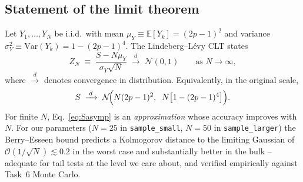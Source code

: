 \documentclass[11pt,a4paper]{article}
\newcommand{\Exp}{\mathbb{E}}
\newcommand{\Var}{\mathrm{Var}}
\begin{document}
\subsection{Statement of the limit theorem}
Let $Y_1,\ldots,Y_N$ be i.i.d.\ with mean
$\mu_Y \equiv \Exp[Y_k] = (2p-1)^2$ and variance
$\sigma_Y^2 \equiv \Var(Y_k) = 1-(2p-1)^4$. The Lindeberg--Lévy CLT
states
\begin{equation}
  Z_N
  \;\equiv\;
  \frac{S - N\mu_Y}{\sigma_Y\sqrt{N}}
  \;\xrightarrow{\;d\;}\;
  \mathcal{N}(0,1)
  \qquad\text{as }N\to\infty,
  \label{eq:clt}
\end{equation}
where $\xrightarrow{d}$ denotes convergence in distribution.
Equivalently, in the original scale,
\begin{equation}
  S \;\xrightarrow{\;d\;}\;
  \mathcal{N}\!\Bigl(N(2p-1)^2,\;\;N\bigl[1-(2p-1)^4\bigr]\Bigr).
  \label{eq:Sasymp}
\end{equation}
For finite $N$, Eq.~\eqref{eq:Sasymp} is an \emph{approximation} whose
accuracy improves with $N$. For our parameters ($N=25$ in
\texttt{sample\_small}, $N=50$ in \texttt{sample\_larger}) the
Berry--Esseen bound predicts a Kolmogorov distance to the limiting
Gaussian of $\mathcal{O}(1/\sqrt{N}) \lesssim 0.2$ in the worst case
and substantially better in the bulk -- adequate for tail tests at
the level we care about, and verified empirically against Task~6
Monte Carlo.
\end{document}
